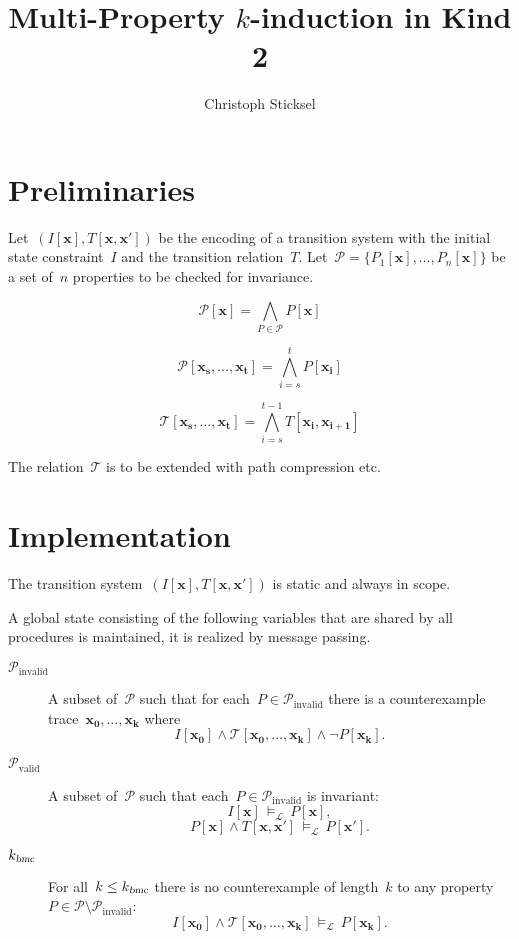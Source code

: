 \documentclass[12pt]{article}
\renewcommand{\textproc}{\textsl}
\renewcommand{\vec}[1]{\mathbf{#1}}            %
\newcommand{\lo}{\mathcal{L}}                  %
\newcommand{\lent}{\,\models_\lo\,}            %
\begin{document}
\title{Multi-Property $k$-induction in Kind 2}

\author{Christoph Sticksel}
\maketitle

\section{Preliminaries}
\label{sec:prelim}


Let~${(I[\vec x], T[\vec x, \vec x'])}$ be the encoding of a transition system with the initial state constraint~$I$ and the transition relation~$T$. Let~${\mathcal{P} = \{ P_1[\vec x], \dotsc, P_n[\vec x] \}}$ be a set of~$n$ properties to be checked for invariance.

\[ \mathcal{P}[\vec{x}] = \bigwedge_{P\in\mathcal{P}} P[\vec{x}] \]

\[ \mathcal{P}[\vec{x_s},\dotsc,\vec{x_t}] = \bigwedge_{i=s}^t P[\vec{x_i}] \]

\[ \mathcal{T}[\vec{x_s},\dotsc,\vec{x_t}] = \bigwedge_{i=s}^{t-1}  T[\vec{x_i},\vec{x_{i+1}}]  \]


The relation~$\mathcal{T}$ is to be extended with path compression etc.

\section{Implementation}
\label{sec:impl}

The transition system~${(I[\vec x], T[\vec x, \vec x'])}$ is static and always in scope.

A global state consisting of the following variables that are shared by all procedures is maintained, it is realized by message passing. 
\begin{description}
\item[$\mathcal{P}_\mathrm{invalid}$] A subset of~$\mathcal{P}$ such that for each~$P\in\mathcal{P}_\mathrm{invalid}$ there is a counterexample trace~$\vec{x_0},\dotsc,\vec{x_k}$ where 
  \[ I[\vec{x_0}] \land \mathcal{T}[\vec{x_0,\dotsc,x_{k}}] \land \lnot P[\vec{x_{k}}]. \]
\item[$\mathcal{P}_\mathrm{valid}$] A subset of~$\mathcal{P}$ such that each~$P\in\mathcal{P}_\mathrm{invalid}$ is invariant:
  \[ I[\vec{x}] \lent P[\vec{x}], \]
  \[ P[\vec{x}] \land T[\vec{x},\vec{x'}] \lent P[\vec{x'}]. \]
\item[$k_\textproc{bmc}$] For all~${k \leq k_\textproc{bmc}}$ there is no counterexample of length~$k$ to any property${P \in \mathcal{P} \setminus \mathcal{P}_\mathrm{invalid}}$: \[ I[\vec{x_0}] \land \mathcal{T}[\vec{x_0,\dotsc,x_{k}}] \lent P[\vec{x_{k}}]. \]
\end{description}
\end{document}
